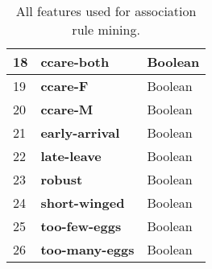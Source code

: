 \begin{table}[ht]
\begin{tabular}{|p{1cm}|p{4cm}|p{4cm}|}
        \hline
        18 & \textbf{ccare-both}          & Boolean   \\
        \hline
        19 & \textbf{ccare-F}             & Boolean   \\
        \hline
        20 & \textbf{ccare-M}             & Boolean   \\
        \hline
        21 & \textbf{early-arrival}       & Boolean   \\
        \hline
        22 & \textbf{late-leave}          & Boolean   \\
        \hline
        23 & \textbf{robust}              & Boolean   \\
        \hline
        24 & \textbf{short-winged}        & Boolean   \\
        \hline
        25 & \textbf{too-few-eggs}        & Boolean   \\
        \hline
        26 & \textbf{too-many-eggs}       & Boolean   \\
        \hline
    \end{tabular}
    \caption{All features used for association rule mining.}
    \label{tab:all-features}
\end{table}